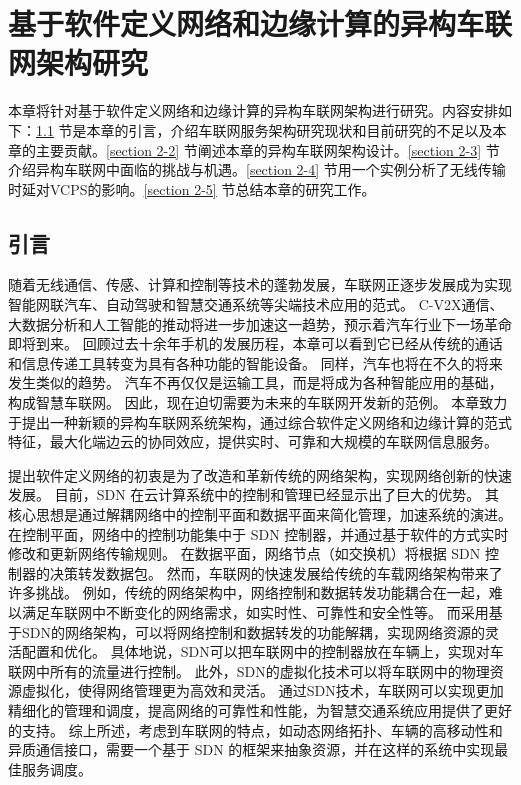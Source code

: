 \chapter{基于软件定义网络和边缘计算的异构车联网架构研究}
本章将针对基于软件定义网络和边缘计算的异构车联网架构进行研究。内容安排如下：\ref{section 2-1} 节是本章的引言，介绍车联网服务架构研究现状和目前研究的不足以及本章的主要贡献。\ref{section 2-2} 节阐述本章的异构车联网架构设计。\ref{section 2-3} 节介绍异构车联网中面临的挑战与机遇。\ref{section 2-4} 节用一个实例分析了无线传输时延对VCPS的影响。\ref{section 2-5} 节总结本章的研究工作。

\section{引言}\label{section 2-1}
随着无线通信、传感、计算和控制等技术的蓬勃发展，车联网正逐步发展成为实现智能网联汽车、自动驾驶和智慧交通系统等尖端技术应用的范式。
C-V2X通信、大数据分析和人工智能的推动将进一步加速这一趋势，预示着汽车行业下一场革命即将到来。
回顾过去十余年手机的发展历程，本章可以看到它已经从传统的通话和信息传递工具转变为具有各种功能的智能设备。
同样，汽车也将在不久的将来发生类似的趋势。
汽车不再仅仅是运输工具，而是将成为各种智能应用的基础，构成智慧车联网。
因此，现在迫切需要为未来的车联网开发新的范例。
本章致力于提出一种新颖的异构车联网系统架构，通过综合软件定义网络和边缘计算的范式特征，最大化端边云的协同效应，提供实时、可靠和大规模的车联网信息服务。

提出软件定义网络的初衷是为了改造和革新传统的网络架构，实现网络创新的快速发展。
目前，SDN 在云计算系统中的控制和管理已经显示出了巨大的优势\cite{jain2013network}。
其核心思想是通过解耦网络中的控制平面和数据平面来简化管理，加速系统的演进。
在控制平面，网络中的控制功能集中于 SDN 控制器，并通过基于软件的方式实时修改和更新网络传输规则。
在数据平面，网络节点（如交换机）将根据 SDN 控制器的决策转发数据包。
然而，车联网的快速发展给传统的车载网络架构带来了许多挑战。
例如，传统的网络架构中，网络控制和数据转发功能耦合在一起，难以满足车联网中不断变化的网络需求，如实时性、可靠性和安全性等。
而采用基于SDN的网络架构，可以将网络控制和数据转发的功能解耦，实现网络资源的灵活配置和优化。
具体地说，SDN可以把车联网中的控制器放在车辆上，实现对车联网中所有的流量进行控制。
此外，SDN的虚拟化技术可以将车联网中的物理资源虚拟化，使得网络管理更为高效和灵活。
通过SDN技术，车联网可以实现更加精细化的管理和调度，提高网络的可靠性和性能，为智慧交通系统应用提供了更好的支持。
综上所述，考虑到车联网的特点，如动态网络拓扑、车辆的高移动性和异质通信接口，需要一个基于 SDN 的框架来抽象资源，并在这样的系统中实现最佳服务调度。

